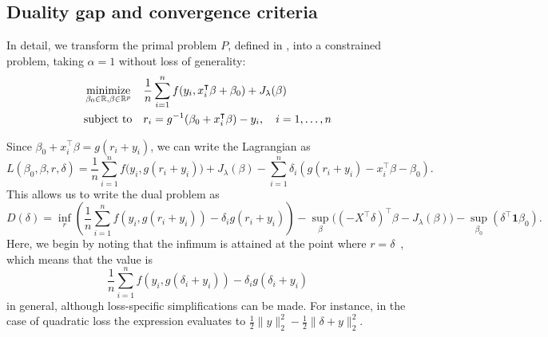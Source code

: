 \documentclass[article]{jss}
\let\Cref\crtCref
\begin{document}
\begin{appendix}

  \section{Duality gap and convergence criteria}
  \label{sec:convergence-criteria-details}

  In detail, we transform the primal problem \(P\), defined in \Cref{eq:slope}, into a
  constrained problem, taking \(\alpha = 1\) without loss of generality:
  \begin{equation}
    \label{eq:slope-constrained}
    \begin{aligned}
       & \operatorname*{minimize}_{\beta_0 \in \mathbb{R},\beta \in \mathbb{R}^p} &  & \frac{1}{n} \sum_{i=1}^n f(y_i, x_i^\intercal \beta + \beta_0) + J_{\lambda}(\beta) \\
       & \text{subject to}                                         &  & r_i = g^{-1}(\beta_0 + x_i^\intercal \beta) - y_i, \quad i = 1, \ldots, n           \\
    \end{aligned}
  \end{equation}

  Since \(\beta_0 + x_i^\intercal \beta = g(r_i + y_i)\), we can write the Lagrangian as
  \[
    L(\beta_0,\beta,r,\delta) = \frac{1}{n} \sum_{i=1}^n f\big(y_i, g(r_i + y_i)\big) + J_{\lambda}(\beta) - \sum_{i=1}^n \delta_i \left(g(r_i + y_i) - x_i^\intercal \beta - \beta_0 \right).
  \]
  This allows us to write the dual problem as
  \[
    D(\delta)  = \inf_r\left( \frac{1}{n} \sum_{i=1}^n f\left(y_i, g(r_i+y_i)\right) - \delta_i g(r_i+ y_i)\right)
    - \sup_\beta \big((-X^\intercal \delta)^\intercal \beta -  J_\lambda(\beta) \big)
    - \sup_{\beta_0} \left( \delta^\intercal \bm{1} \beta_0\right).
  \]
  Here, we begin by noting that the infimum is attained at the point where
  \(r = \delta\)~\citep{fercoq2015}, which means that the value is
  \[
    \frac{1}{n} \sum_{i=1}^n f\left(y_i, g(\delta_i+y_i)\right) - \delta_i g(\delta_i + y_i)
  \]
  in general, although loss-specific simplifications can be made. For instance, in the case of
  quadratic loss the expression evaluates to \(\frac{1}{2} \lVert y \rVert_2^2 - \frac{1}{2} \lVert \delta + y \lVert^2_2 \).


\end{appendix}
\end{document}
